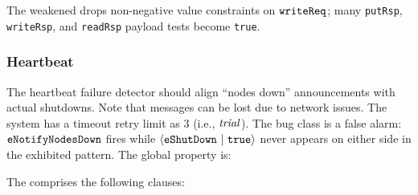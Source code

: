 \vspace{-.4cm}\par\nobreak\noindent
The weakened \tyName{} drops non-negative value constraints on \(\boldsymbol{{\tt writeReq}}\); many \texttt{putRsp}, \texttt{writeRsp}, and \texttt{readRsp} payload tests become \texttt{true}.

\subsubsection*{Heartbeat}
The heartbeat failure detector should align ``nodes down'' announcements with actual shutdowns. Note that messages can be lost due to network issues. The system has a timeout retry limit as $3$ (i.e., $\mathit{trial}$). The bug class is a false alarm: \(\boldsymbol{{\tt eNotifyNodesDown}}\) fires while \({\langle} {\boldsymbol{{\tt eShutDown}}~|~{{\tt true}}} {\rangle}\) never appears on either side in the exhibited pattern. The global property is:
\vspace{-.35cm}\par{}
\vspace{-.4cm}\par\nobreak\noindent
The \tyName{} comprises the following clauses:
\vspace{-.35cm}\par{}
